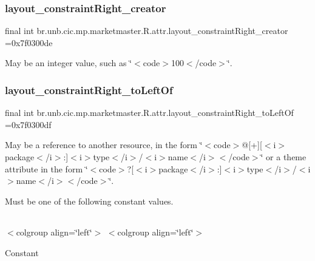 \subsubsection{\texorpdfstring{layout\+\_\+constraint\+Right\+\_\+creator}{layout\_constraintRight\_creator}}
{\footnotesize\ttfamily final int br.\+unb.\+cic.\+mp.\+marketmaster.\+R.\+attr.\+layout\+\_\+constraint\+Right\+\_\+creator =0x7f0300de\hspace{0.3cm}{\ttfamily [static]}}

May be an integer value, such as \char`\"{}$<$code$>$100$<$/code$>$\char`\"{}. \mbox{\label{classbr_1_1unb_1_1cic_1_1mp_1_1marketmaster_1_1R_1_1attr_a1ded40ef82b446d32017b09d9bd5e0ed}} 
\subsubsection{\texorpdfstring{layout\+\_\+constraint\+Right\+\_\+to\+Left\+Of}{layout\_constraintRight\_toLeftOf}}
{\footnotesize\ttfamily final int br.\+unb.\+cic.\+mp.\+marketmaster.\+R.\+attr.\+layout\+\_\+constraint\+Right\+\_\+to\+Left\+Of =0x7f0300df\hspace{0.3cm}{\ttfamily [static]}}

May be a reference to another resource, in the form \char`\"{}$<$code$>$@\mbox{[}+\mbox{]}\mbox{[}$<$i$>$package$<$/i$>$\+:\mbox{]}$<$i$>$type$<$/i$>$/$<$i$>$name$<$/i$>$$<$/code$>$\char`\"{} or a theme attribute in the form \char`\"{}$<$code$>$?\mbox{[}$<$i$>$package$<$/i$>$\+:\mbox{]}$<$i$>$type$<$/i$>$/$<$i$>$name$<$/i$>$$<$/code$>$\char`\"{}. 

Must be one of the following constant values.

\tabulinesep=1mm
\begin{longtabu} spread 0pt [c]{*{0}{|X[-1]}|}
\hline
\end{longtabu}
$<$colgroup align=\char`\"{}left\char`\"{}$>$ $<$colgroup align=\char`\"{}left\char`\"{}$>$ 

Constant

